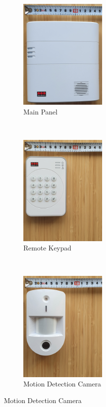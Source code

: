 \begin{figure}[!ht]
    \centering
    \begin{subfigure}[t]{0.33\textwidth}
        \centering
        \includegraphics[height=2.15in]{images/main-panel.png}
        \caption{Main Panel}
        \label{fig:main-panel}
    \end{subfigure}%
    ~
    \begin{subfigure}[t]{0.33\textwidth}
        \centering
        \includegraphics[height=2.15in]{images/keypad.png}
        \caption{Remote Keypad}
        \label{fig:remote-keypad}
    \end{subfigure}%
    ~
    \begin{subfigure}[t]{0.33\textwidth}
        \centering
        \includegraphics[height=2.15in]{images/camera.png}
        \caption{Motion Detection Camera}
        \label{fig:motion-camera}
    \end{subfigure}
    

\end{figure}
